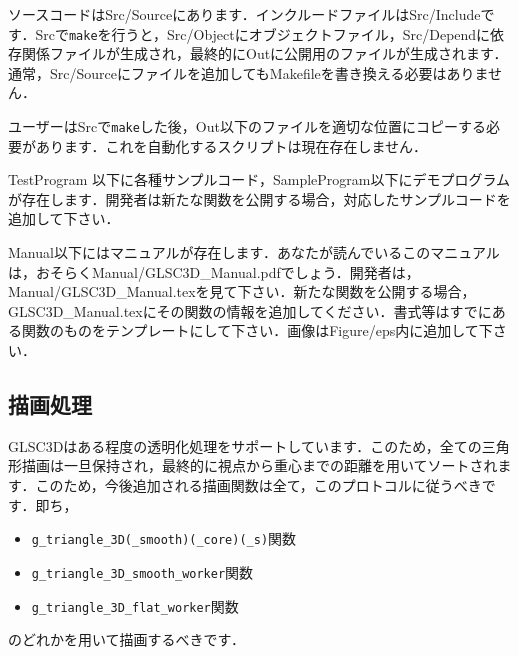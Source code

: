 \documentclass[platex,a4paper,12pt]{jsarticle}%
\begin{document}
ソースコードはSrc/Sourceにあります．インクルードファイルはSrc/Includeです．Srcで\verb|make|を行うと，Src/Objectにオブジェクトファイル，Src/Dependに依存関係ファイルが生成され，最終的にOutに公開用のファイルが生成されます．通常，Src/Sourceにファイルを追加してもMakefileを書き換える必要はありません．

ユーザーはSrcで\verb|make|した後，Out以下のファイルを適切な位置にコピーする必要があります．これを自動化するスクリプトは現在存在しません．

TestProgram 以下に各種サンプルコード，SampleProgram以下にデモプログラムが存在します．開発者は新たな関数を公開する場合，対応したサンプルコードを追加して下さい．

Manual以下にはマニュアルが存在します．あなたが読んでいるこのマニュアルは，おそらくManual/GLSC3D\_Manual.pdfでしょう．開発者は，Manual/GLSC3D\_Manual.texを見て下さい．新たな関数を公開する場合，GLSC3D\_Manual.texにその関数の情報を追加してください．書式等はすでにある関数のものをテンプレートにして下さい．画像はFigure/eps内に追加して下さい．


\subsection{描画処理}
GLSC3Dはある程度の透明化処理をサポートしています．このため，全ての三角形描画は一旦保持され，最終的に視点から重心までの距離を用いてソートされます．このため，今後追加される描画関数は全て，このプロトコルに従うべきです．即ち，

\begin{itemize}
 \item \verb|g_triangle_3D(_smooth)(_core)(_s)|関数
 \item \verb|g_triangle_3D_smooth_worker|関数
 \item \verb|g_triangle_3D_flat_worker|関数
\end{itemize}

のどれかを用いて描画するべきです．
\end{document}
